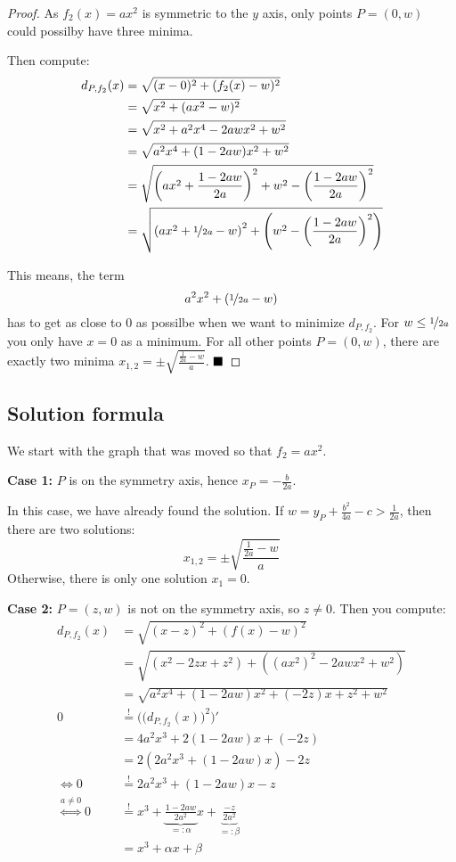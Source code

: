 \begin{proof}
As $f_2(x) = ax^2$ is symmetric to the $y$ axis, only points 
$P = (0, w)$ could possilby have three minima.

Then compute:
\begin{align}
  d_{P,{f_2}}(x)  &= \sqrt{(x-0)^2 + (f_2(x)-w)^2}\\
    &= \sqrt{x^2 + (ax^2-w)^2}\\
    &= \sqrt{x^2 + a^2 x^4-2aw x^2+w^2}\\
    &= \sqrt{a^2 x^4 + (1-2aw) x^2 + w^2}\\
    &= \sqrt{\left (a x^2 + \frac{1-2 a w}{2a} \right )^2 + w^2 - \left (\frac{1-2 a w}{2a} \right )^2}\\
    &= \sqrt{\left (a x^2 + \nicefrac{1}{2a}- w \right )^2 + \left (w^2 - \left (\frac{1-2 a w}{2a} \right )^2 \right)}
\end{align}

This means, the term
\[a^2 x^2 + (\nicefrac{1}{2a}- w)\]
has to get as close to $0$ as possilbe when we want to minimize 
$d_{P,{f_2}}$. For $w \leq \nicefrac{1}{2a}$ you only have $x = 0$ as a minimum.
For all other points $P = (0, w)$, there are exactly two minima $x_{1,2} = \pm \sqrt{\frac{\frac{1}{2a} - w}{a}}$.
$\qed$
\end{proof}

\subsection{Solution formula}
We start with the graph that was moved so that $f_2 = ax^2$.

\textbf{Case 1:} $P$ is on the symmetry axis, hence $x_P = - \frac{b}{2a}$.

In this case, we have already found the solution. If $w = y_P + \frac{b^2}{4a} - c > \frac{1}{2a}$,
then there are two solutions:
\[x_{1,2} = \pm \sqrt{\frac{\frac{1}{2a} - w}{a}}\]
Otherwise, there is only one solution $x_1 = 0$.

\textbf{Case 2:} $P = (z, w)$ is not on the symmetry axis, so $z \neq 0$. Then you compute:
\begin{align}
  d_{P,{f_2}}(x)  &= \sqrt{(x-z)^2 + (f(x)-w)^2}\\
    &= \sqrt{(x^2 - 2zx + z^2) + ((ax^2)^2 - 2 awx^2 + w^2)}\\
    &= \sqrt{a^2x^4 + (1- 2 aw)x^2 +(- 2z)x + z^2 + w^2}\\
  0 &\stackrel{!}{=} \Big(\big(d_{P, {f_2}}(x)\big)^2\Big)' \\
    &= 4a^2x^3 + 2(1- 2 aw)x +(- 2z)\\
    &= 2 \left (2a^2x^3 + (1- 2 aw)x \right ) - 2z\\
    \Leftrightarrow 0 &\stackrel{!}{=} 2a^2x^3  + (1- 2 aw) x - z\\
\stackrel{a \neq 0}{\Leftrightarrow} 0 &\stackrel{!}{=} x^3 + \underbrace{\frac{1- 2 aw}{2 a^2}}_{=: \alpha} x  + \underbrace{\frac{-z}{2 a^2}}_{=: \beta}\\
    &= x^3 + \alpha x + \beta\label{eq:simple-cubic-equation-for-quadratic-distance}
\end{align}

